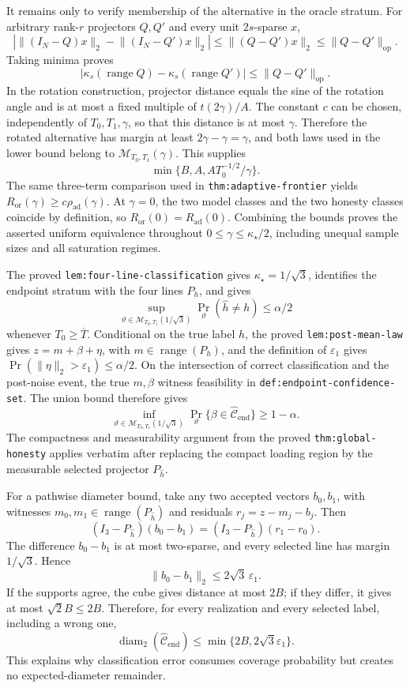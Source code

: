 It remains only to verify membership of the alternative in the oracle stratum.  For arbitrary rank-\(r\) projectors \(Q,Q'\) and every unit \(2s\)-sparse \(x\),
\[
 \left|\lVert(I_N-Q)x\rVert_2-\lVert(I_N-Q')x\rVert_2\right|
 \le\lVert(Q-Q')x\rVert_2
 \le\lVert Q-Q'\rVert_{\mathrm{op}}.
\]
Taking minima proves
\[
 |\kappa_s(\operatorname{range}Q)-\kappa_s(\operatorname{range}Q')|
 \le\lVert Q-Q'\rVert_{\mathrm{op}}.
\]
In the rotation construction, projector distance equals the sine of the rotation angle and is at most a fixed multiple of \(t(2\gamma)/A\).  The constant \(c\) can be chosen, independently of \(T_0,T_1,\gamma\), so that this distance is at most \(\gamma\).  Therefore the rotated alternative has margin at least \(2\gamma-\gamma=\gamma\), and both laws used in the lower bound belong to \(\mathcal M_{T_0,T_1}(\gamma)\).  This supplies
\[
 \min\{B,A,AT_0^{-1/2}/\gamma\}.
\]
The same three-term comparison used in \texttt{thm:adaptive-frontier} yields \(R_{\mathrm{or}}(\gamma)\ge c\rho_{\mathrm{ad}}(\gamma)\).  At \(\gamma=0\), the two model classes and the two honesty classes coincide by definition, so \(R_{\mathrm{or}}(0)=R_{\mathrm{ad}}(0)\).  Combining the bounds proves the asserted uniform equivalence throughout \(0\le\gamma\le\kappa_\star/2\), including unequal sample sizes and all saturation regimes.

The proved \texttt{lem:four-line-classification} gives \(\kappa_\star=1/\sqrt3\), identifies the endpoint stratum with the four lines \(P_h\), and gives
\[
 \sup_{\vartheta\in\mathcal M_{T_0,T_1}(1/\sqrt3)}
 \Pr_\vartheta(\widehat h\ne h)\le\alpha/2
\]
whenever \(T_0\ge\overline T\).  Conditional on the true label \(h\), the proved \texttt{lem:post-mean-law} gives \(z=m+\beta+\eta\), with \(m\in\operatorname{range}(P_h)\), and the definition of \(\varepsilon_1\) gives \(\Pr(\lVert\eta\rVert_2>\varepsilon_1)\le\alpha/2\).  On the intersection of correct classification and the post-noise event, the true \(m,\beta\) witness feasibility in \texttt{def:endpoint-confidence-set}.  The union bound therefore gives
\[
 \inf_{\vartheta\in\mathcal M_{T_0,T_1}(1/\sqrt3)}
 \Pr_\vartheta\{\beta\in\widehat{\mathcal C}_{\mathrm{end}}\}
 \ge1-\alpha.
\]
The compactness and measurability argument from the proved \texttt{thm:global-honesty} applies verbatim after replacing the compact loading region by the measurable selected projector \(P_{\widehat h}\).

For a pathwise diameter bound, take any two accepted vectors \(b_0,b_1\), with witnesses \(m_0,m_1\in\operatorname{range}(P_{\widehat h})\) and residuals \(r_j=z-m_j-b_j\).  Then
\[
 (I_3-P_{\widehat h})(b_0-b_1)
 =(I_3-P_{\widehat h})(r_1-r_0).
\]
The difference \(b_0-b_1\) is at most two-sparse, and every selected line has margin \(1/\sqrt3\).  Hence
\[
 \lVert b_0-b_1\rVert_2\le2\sqrt3\,\varepsilon_1.
\]
If the supports agree, the cube gives distance at most \(2B\); if they differ, it gives at most \(\sqrt2B\le2B\).  Therefore, for every realization and every selected label, including a wrong one,
\[
 \operatorname{diam}_2(\widehat{\mathcal C}_{\mathrm{end}})
 \le\min\{2B,2\sqrt3\varepsilon_1\}.
\]
This explains why classification error consumes coverage probability but creates no expected-diameter remainder.

